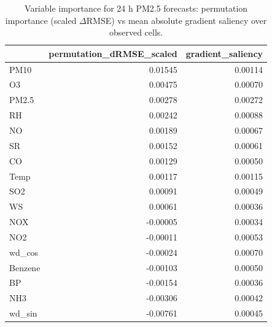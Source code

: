 \begin{table}
\caption{Variable importance for 24 h PM2.5 forecasts: permutation importance (scaled $\Delta$RMSE) vs mean absolute gradient saliency over observed cells.}
\label{tab:importance}
\begin{tabular}{lrr}
\toprule
 & permutation\_dRMSE\_scaled & gradient\_saliency \\
\midrule
PM10 & 0.01545 & 0.00114 \\
O3 & 0.00475 & 0.00070 \\
PM2.5 & 0.00278 & 0.00272 \\
RH & 0.00242 & 0.00088 \\
NO & 0.00189 & 0.00067 \\
SR & 0.00152 & 0.00061 \\
CO & 0.00129 & 0.00050 \\
Temp & 0.00117 & 0.00115 \\
SO2 & 0.00091 & 0.00049 \\
WS & 0.00061 & 0.00036 \\
NOX & -0.00005 & 0.00034 \\
NO2 & -0.00011 & 0.00053 \\
wd\_cos & -0.00024 & 0.00070 \\
Benzene & -0.00103 & 0.00050 \\
BP & -0.00154 & 0.00036 \\
NH3 & -0.00306 & 0.00042 \\
wd\_sin & -0.00761 & 0.00045 \\
\bottomrule
\end{tabular}
\end{table}
